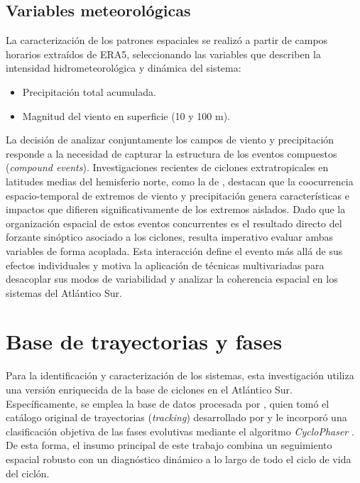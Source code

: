 \subsection{Variables meteorológicas}\label{subsec:variables}
La caracterización de los patrones espaciales se realizó a partir de campos horarios extraídos de ERA5, seleccionando las variables que describen la intensidad hidrometeorológica y dinámica del sistema:
\begin{itemize}
    \item Precipitación total acumulada.
    \item Magnitud del viento en superficie (10 y 100 m).
\end{itemize}

La decisión de analizar conjuntamente los campos de viento y precipitación responde a la necesidad de capturar la estructura de los eventos compuestos (\textit{compound events}). Investigaciones recientes de ciclones extratropicales en latitudes medias del hemisferio norte, como la de \citet{chen2025characteristics}, destacan que la coocurrencia espacio-temporal de extremos de viento y precipitación genera características e impactos que difieren significativamente de los extremos aislados. Dado que la organización espacial de estos eventos concurrentes es el resultado directo del forzante sinóptico asociado a los ciclones, resulta imperativo evaluar ambas variables de forma acoplada. Esta interacción define el evento más allá de sus efectos individuales y motiva la aplicación de técnicas multivariadas para desacoplar sus modos de variabilidad y analizar la coherencia espacial en los sistemas del Atlántico Sur.

\section{Base de trayectorias y fases}\label{sec:bd_ciclones}

Para la identificación y caracterización de los sistemas, esta investigación utiliza una versión enriquecida de la base de ciclones en el Atlántico Sur. Específicamente, se emplea la base de datos procesada por \citet{coutodesouza2024new}, quien tomó el catálogo original de trayectorias (\textit{tracking}) desarrollado por \citet{gramcianinov2019properties} y le incorporó una clasificación objetiva de las fases evolutivas mediante el algoritmo \textit{CycloPhaser} \citep{deSouza2025CycloPhaser}. De esta forma, el insumo principal de este trabajo combina un seguimiento espacial robusto con un diagnóstico dinámico a lo largo de todo el ciclo de vida del ciclón.

